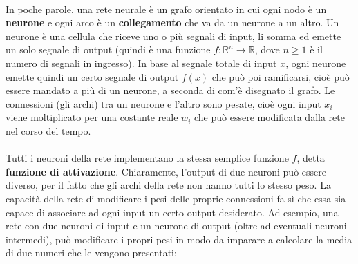 \documentclass[12pt]{article}
\begin{document}
\paragraph{}
In poche parole, una rete neurale è un grafo orientato in cui ogni nodo è un \textbf{neurone} e ogni arco è un \textbf{collegamento} che va da un neurone a un altro. Un neurone è una cellula che riceve uno o più segnali di input, li somma ed emette un solo segnale di output (quindi è una funzione $f : \mathbb{R}^n \rightarrow \mathbb{R}$, dove $n \ge 1$ è il numero di segnali in ingresso). In base al segnale totale di input $x$, ogni neurone emette quindi un certo segnale di output $f(x)$ che può poi ramificarsi, cioè può essere mandato a più di un neurone, a seconda di com'è disegnato il grafo. Le connessioni (gli archi) tra un neurone e l'altro sono pesate, cioè ogni input $x_i$ viene moltiplicato per una costante reale $w_i$ che può essere modificata dalla rete nel corso del tempo.

\paragraph{}
Tutti i neuroni della rete implementano la stessa semplice funzione $f$, detta \textbf{funzione di attivazione}. Chiaramente, l'output di due neuroni può essere diverso, per il fatto che gli archi della rete non hanno tutti lo stesso peso. La capacità della rete di modificare i pesi delle proprie connessioni fa sì che essa sia capace di associare ad ogni input un certo output desiderato. Ad esempio, una rete con due neuroni di input e un neurone di output (oltre ad eventuali neuroni intermedi), può modificare i propri pesi in modo da imparare a calcolare la media di due numeri che le vengono presentati:

\begin{center}
\end{center}
\end{document}
